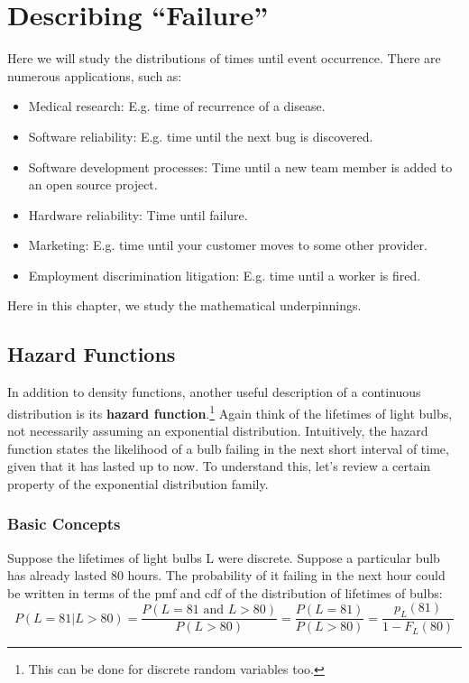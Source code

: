 \chapter{Describing ``Failure''} 
\label{haz}

Here we will study the distributions of times until event occurrence.
There are numerous applications, such as:

\begin{itemize}

\item Medical research:  E.g. time of recurrence of a disease.

\item Software reliability:  E.g. time until the next bug is discovered.

\item Software development processes: Time until a new team member is
added to an open source project.

\item Hardware reliability:  Time until failure.

\item Marketing:  E.g. time until your customer moves to some other
provider.

\item Employment discrimination litigation:  E.g. time until a worker is
fired.

\end{itemize}

Here in this chapter, we study the mathematical underpinnings.

\section{Hazard Functions}

In addition to density functions, another useful description of a
continuous distribution is its {\bf hazard function}.\footnote{This can
be done for discrete random variables too.} Again think of the lifetimes
of light bulbs, not necessarily assuming an exponential distribution.
Intuitively, the hazard function states the likelihood of a bulb failing
in the next short interval of time, given that it has lasted up to now.  To understand this, let's review a certain property of the exponential distribution family.  \subsection{Basic Concepts} Suppose the lifetimes of light bulbs L were discrete.  Suppose a particular bulb has already lasted 80 hours.  The probability of it failing in the next hour could be written in terms of the pmf and cdf of the distribution of lifetimes of bulbs: \begin{equation} P(L = 81 | L > 80) = \frac{P(L = 81 \textrm{ and } L > 80)}{P(L > 80)} 
= \frac{P(L = 81)}{P(L > 80)} 
= \frac{p_L(81)}{1-F_L(80)}
\end{equation}

